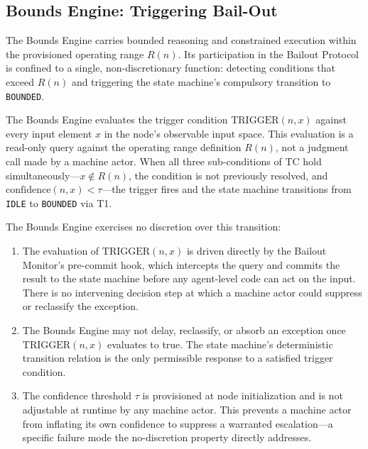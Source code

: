 \subsection{Bounds Engine: Triggering Bail-Out}
\label{sec:bounds-trigger}

The Bounds Engine carries bounded reasoning and constrained execution within the provisioned operating range $R(n)$. Its participation in the Bailout Protocol is confined to a single, non-discretionary function: detecting conditions that exceed $R(n)$ and triggering the state machine's compulsory transition to \texttt{BOUNDED}.

The Bounds Engine evaluates the trigger condition $\mathrm{TRIGGER}(n, x)$ against every input element $x$ in the node's observable input space. This evaluation is a read-only query against the operating range definition $R(n)$, not a judgment call made by a machine actor. When all three sub-conditions of TC hold simultaneously---$x \notin R(n)$, the condition is not previously resolved, and $\mathrm{confidence}(n, x) < \tau$---the trigger fires and the state machine transitions from \texttt{IDLE} to \texttt{BOUNDED} via T1.

The Bounds Engine exercises no discretion over this transition:

\begin{enumerate}\itemsep=0pt
\item The evaluation of $\mathrm{TRIGGER}(n, x)$ is driven directly by the Bailout Monitor's pre-commit hook, which intercepts the query and commits the result to the state machine before any agent-level code can act on the input. There is no intervening decision step at which a machine actor could suppress or reclassify the exception.

\item The Bounds Engine may not delay, reclassify, or absorb an exception once $\mathrm{TRIGGER}(n, x)$ evaluates to true. The state machine's deterministic transition relation is the only permissible response to a satisfied trigger condition.

\item The confidence threshold $\tau$ is provisioned at node initialization and is not adjustable at runtime by any machine actor. This prevents a machine actor from inflating its own confidence to suppress a warranted escalation---a specific failure mode the no-discretion property directly addresses.
\end{enumerate}

